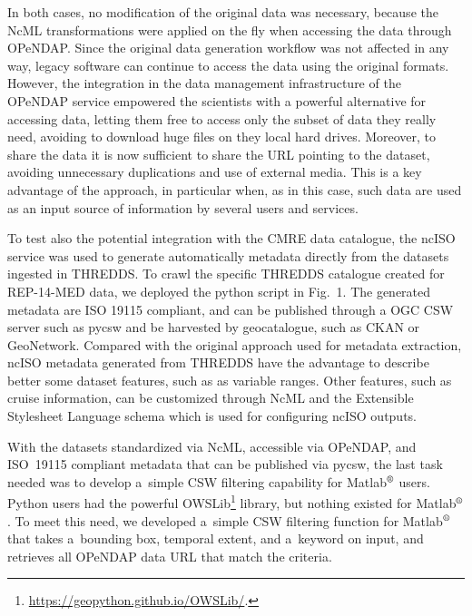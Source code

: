 \documentclass[osd, online, hvmath]{copernicus}
\begin{document}
In both cases, no modification of the original data was necessary, because the NcML transformations were applied on the fly when accessing the data through OPeNDAP. Since the original data generation workflow was not affected in any way, legacy software can continue to access the data using the original formats. However, the integration in the data management infrastructure of the OPeNDAP service empowered the scientists with a powerful alternative for accessing data, letting them free to access only the subset of data they really need, avoiding to download huge files on they local hard drives. Moreover, to share the data it is now sufficient to share the URL pointing to the dataset, avoiding unnecessary duplications and use of external media. This is a key advantage of the approach, in particular when, as in this case, such data are used as an input source of information by several users and services.

To test also the potential integration with the CMRE data catalogue, the ncISO service was used to generate automatically metadata directly from the datasets ingested in THREDDS. To crawl the specific THREDDS catalogue created for REP-14-MED data, we deployed the python script in Fig.~1. The generated metadata are ISO 19115 compliant, and can be published through a OGC CSW server such as pycsw and be harvested by geocatalogue, such as CKAN or GeoNetwork. 
Compared with the original approach used for metadata extraction, ncISO metadata generated from THREDDS have the advantage to describe better some dataset features, such as as variable ranges. Other features, such as cruise information, can be customized through NcML and the Extensible Stylesheet Language schema which is used for configuring ncISO outputs. 

With the datasets standardized via NcML, accessible via OPeNDAP, and ISO~19115 compliant metadata that can be published via pycsw, the
last task needed was to develop a~simple CSW filtering capability for Matlab$^{\text{\textregistered}}$ users. Python users had the powerful
OWSLib\footnote{\url{https://geopython.github.io/OWSLib/}.} library, but nothing existed for Matlab$^{\text{\textregistered}}$. To meet
this need, we developed a~simple CSW filtering function for Matlab$^{\text{\textregistered}}$ that takes a~bounding box, temporal extent, and a~keyword on input, and retrieves all OPeNDAP data URL that match the criteria.
\end{document}
